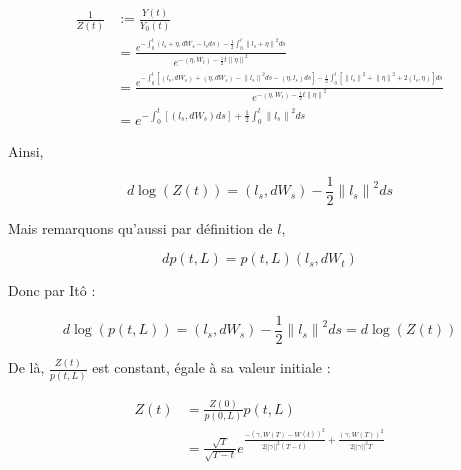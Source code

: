 \documentclass[../finalreport.tex]{subfiles}
\begin{document}
\begin{displaymath}
	\begin{split}
	\frac{1}{Z \left( t \right)} &:= \frac{Y \left( t \right)}{Y_0 \left( t \right)} \\
	 &= \frac{e^{- \int_{0}^{t} \left( l_{s} + \eta, dW_{s} - l_s ds \right) - \frac{1}{2} \int_{0}^{t} {\| l_{s} + \eta \|}^{2} ds}}{e^{- \left( \eta, W_{t} \right)-\frac{1}{2} t {\| \eta \|}^{2}}} \\
	&= \frac{e^{- \int_{0}^{t} \left[ \left( l_s, dW_{s} \right) + \left( \eta, dW_{s} \right) - {\| l_{s} \|}^{2} ds - \left( \eta, l_s\right) ds \right]  - \frac{1}{2} \int_{0}^{t} \left[ {\| l_{s} \|}^{2} + {\| \eta \|}^{2} + 2 \left(l_s, \eta \right) \right] ds}}{e^{- \left( \eta, W_{t} \right)-\frac{1}{2} t {\| \eta \|}^{2}}} \\
	&= e^{- \int_{0}^{t} \left[ \left( l_s, dW_{s} \right) ds \right] + \frac{1}{2} \int_{0}^{t} {\| l_{s} \|}^{2} ds}
	\end{split}
\end{displaymath}

\par Ainsi, 

\begin{displaymath}
d \log \left( Z \left( t \right) \right) = \left(l_s, d W_s \right) - \frac{1}{2} {\| l_{s} \|}^{2} ds
\end{displaymath}

\par Mais remarquons qu'aussi par définition de $l$, 

\begin{displaymath}
d p \left( t, L \right) =  p \left( t, L \right) \left( l_s, d W_t \right)
\end{displaymath}

\par Donc par Itô :

\begin{displaymath}
d \log \left( p \left( t, L \right) \right) = \left(l_s, d W_s \right) - \frac{1}{2} {\| l_{s} \|}^{2} ds = d \log \left( Z \left( t \right) \right)
\end{displaymath}

\par De là, $\frac{Z \left( t \right)}{ p \left( t, L \right) }$ est constant, égale à sa valeur initiale :

\begin{displaymath}
	\begin{split}
	Z \left( t \right) &= \frac{Z \left( 0 \right)}{ p \left( 0, L \right) } p \left( t, L \right) \\
	&= \frac{\sqrt{T}}{\sqrt{T - t}} e^{\frac{- \left( \gamma, W \left( T \right) - W \left( t \right) \right)^2}{2 ||\gamma||^2 \left( T - t \right)} + \frac{\left( \gamma, W \left( T \right) \right)^2}{2 ||\gamma||^2 T }}
	\end{split}
\end{displaymath}
\end{document}
